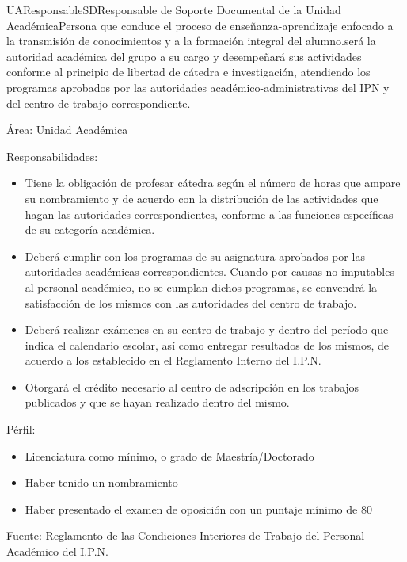 \begin{actor}{UAResponsableSD}{Responsable de Soporte Documental de la Unidad Académica}{Persona que conduce el proceso de enseñanza-aprendizaje enfocado a la transmisión de conocimientos y a la formación integral del alumno.será la autoridad académica del grupo a su cargo y desempeñará sus actividades conforme al principio de libertad de cátedra e investigación, atendiendo los programas aprobados por las autoridades académico-administrativas del IPN y del centro de trabajo correspondiente.}
	
	
	\item[Área:] Unidad Académica
	
	\item[Responsabilidades:]\cdtEmpty
	\begin{itemize}
		\item Tiene la obligación de profesar cátedra según el número de
		horas que ampare su nombramiento y de acuerdo con la distribución de las actividades que hagan las
		autoridades correspondientes, conforme a las funciones específicas de su categoría académica.
		\item Deberá cumplir con los programas de su asignatura aprobados
		por las autoridades académicas correspondientes. Cuando por causas no imputables al personal
		académico, no se cumplan dichos programas, se convendrá la satisfacción de los mismos con las
		autoridades del centro de trabajo.
		\item Deberá realizar exámenes en su centro de trabajo y dentro del
		período que indica el calendario escolar, así como entregar resultados de los mismos, de acuerdo a los establecido en el Reglamento Interno del I.P.N.
		\item Otorgará el crédito necesario al centro de adscripción en los trabajos publicados y que se hayan realizado dentro del mismo.
	\end{itemize}
	
	\item[Pérfil:]\cdtEmpty
	\begin{itemize}
		\item Licenciatura como mínimo, o grado de Maestría/Doctorado
		\item Haber tenido un nombramiento
		\item Haber presentado el examen de oposición con un puntaje mínimo de 80
	\end{itemize}
	
	\item[Fuente:]Reglamento de las Condiciones Interiores de Trabajo del Personal Académico del I.P.N.
	
\end{actor}
